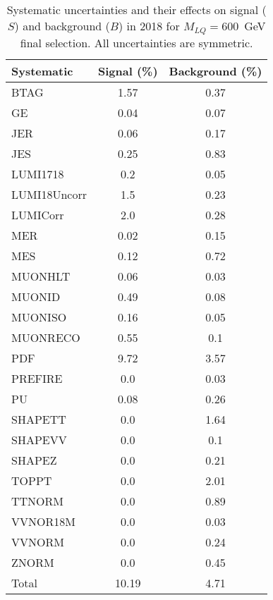 \begin{table}[htbp]
\begin{center}
\caption{Systematic uncertainties and their effects on signal ($S$) and background ($B$) in 2018 for $M_{LQ}=600$~GeV final selection. All uncertainties are symmetric.}
\begin{tabular}{lcc}
\hline\hline
Systematic & Signal (\%) & Background (\%) \\ \hline 
BTAG & 1.57 & 0.37\\ 
GE & 0.04 & 0.07\\ 
JER & 0.06 & 0.17\\ 
JES & 0.25 & 0.83\\ 
LUMI1718 & 0.2 & 0.05\\ 
LUMI18Uncorr & 1.5 & 0.23\\ 
LUMICorr & 2.0 & 0.28\\ 
MER & 0.02 & 0.15\\ 
MES & 0.12 & 0.72\\ 
MUONHLT & 0.06 & 0.03\\ 
MUONID & 0.49 & 0.08\\ 
MUONISO & 0.16 & 0.05\\ 
MUONRECO & 0.55 & 0.1\\ 
PDF & 9.72 & 3.57\\ 
PREFIRE & 0.0 & 0.03\\ 
PU & 0.08 & 0.26\\ 
SHAPETT & 0.0 & 1.64\\ 
SHAPEVV & 0.0 & 0.1\\ 
SHAPEZ & 0.0 & 0.21\\ 
TOPPT & 0.0 & 2.01\\ 
TTNORM & 0.0 & 0.89\\ 
VVNOR18M & 0.0 & 0.03\\ 
VVNORM & 0.0 & 0.24\\ 
ZNORM & 0.0 & 0.45\\ 
Total & 10.19 & 4.71\\ \hline \hline
\end{tabular}
\label{tab:SysUncertainties_uujj_600}
\end{center}
\end{table}

